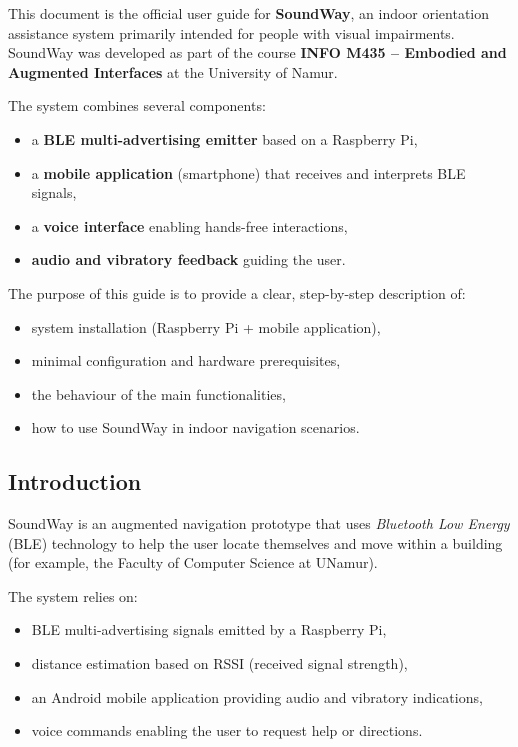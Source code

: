 \documentclass[12pt,a4paper]{article}
\begin{document}
This document is the official user guide for \textbf{SoundWay}, an indoor orientation assistance system primarily intended for people with visual impairments.  
SoundWay was developed as part of the course \textbf{INFO M435 -- Embodied and Augmented Interfaces} at the University of Namur.

The system combines several components:
\begin{itemize}
    \item a \textbf{BLE multi-advertising emitter} based on a Raspberry Pi,
    \item a \textbf{mobile application} (smartphone) that receives and interprets BLE signals,
    \item a \textbf{voice interface} enabling hands-free interactions,
    \item \textbf{audio and vibratory feedback} guiding the user.
\end{itemize}

The purpose of this guide is to provide a clear, step-by-step description of:
\begin{itemize}
    \item system installation (Raspberry Pi + mobile application),
    \item minimal configuration and hardware prerequisites,
    \item the behaviour of the main functionalities,
    \item how to use SoundWay in indoor navigation scenarios.
\end{itemize}

\subsection{Introduction}
SoundWay is an augmented navigation prototype that uses \textit{Bluetooth Low Energy} (BLE) technology to help the user locate themselves and move within a building (for example, the Faculty of Computer Science at UNamur).  

The system relies on:
\begin{itemize}
    \item BLE multi-advertising signals emitted by a Raspberry Pi,
    \item distance estimation based on RSSI (received signal strength),
    \item an Android mobile application providing audio and vibratory indications,
    \item voice commands enabling the user to request help or directions.
\end{itemize}
\end{document}
